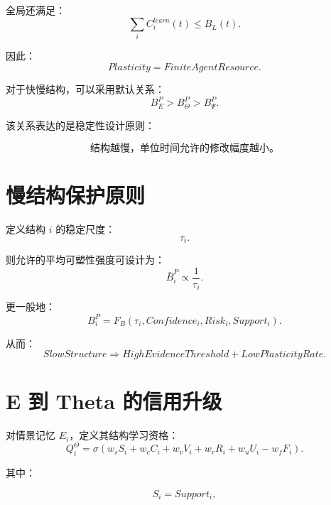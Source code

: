 全局还满足：
\begin{equation}
\boxed{
\sum_i
C_i^{learn}(t)
\leq
B_L(t).
}
\end{equation}

因此：
\begin{equation}
\boxed{
Plasticity
=
FiniteAgentResource.
}
\end{equation}

对于快慢结构，可以采用默认关系：
\begin{equation}
B_E^P
>
B_\Theta^P
>
B_\Psi^P.
\end{equation}

该关系表达的是稳定性设计原则：

\begin{equation}
\boxed{
\text{结构越慢，单位时间允许的修改幅度越小。}
}
\end{equation}


\section{慢结构保护原则}

定义结构 $i$ 的稳定尺度：
\begin{equation}
\tau_i.
\end{equation}

则允许的平均可塑性强度可设计为：
\begin{equation}
\bar B_i^P
\propto
\frac{1}{\tau_i}.
\end{equation}

更一般地：
\begin{equation}
B_i^P
=
F_B(
\tau_i,
Confidence_i,
Risk_i,
Support_i
).
\end{equation}

从而：
\begin{equation}
\boxed{
SlowStructure
\Rightarrow
HighEvidenceThreshold
+
LowPlasticityRate.
}
\end{equation}


\section{E 到 Theta 的信用升级}

对情景记忆 $E_i$，定义其结构学习资格：
\begin{equation}
Q_i^\Theta
=
\sigma
\left(
w_s S_i
+
w_c C_i
+
w_v V_i
+
w_r R_i
+
w_u U_i
-
w_f F_i
\right).
\end{equation}

其中：

\begin{equation}
S_i
=
Support_i,
\end{equation}

